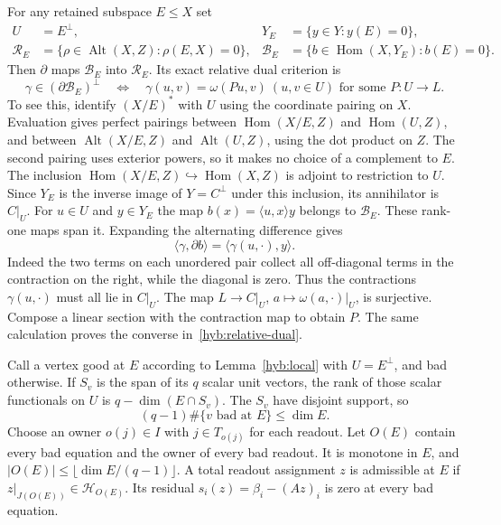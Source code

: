 \documentclass[11pt]{article}
\DeclareMathOperator{\Hom}{Hom}
\DeclareMathOperator{\Alt}{Alt}
\theoremstyle{definition}
\theoremstyle{remark}
\numberwithin{equation}{section}
\begin{document}
For any retained subspace $E\le X$ set
\[
 \begin{aligned}
 U&=E^\perp,& Y_E&=\{y\in Y:y(E)=0\},\\
 \mathcal R_E&=\{\rho\in\Alt(X,Z):\rho(E,X)=0\},&
 \mathcal B_E&=\{b\in\Hom(X,Y_E):b(E)=0\}.
 \end{aligned}
\]
Then $\partial$ maps $\mathcal B_E$ into $\mathcal R_E$.
Its exact relative dual criterion is
\begin{equation}
 \gamma\in(\partial\mathcal B_E)^\perp
 \quad\Longleftrightarrow\quad
 \gamma(u,v)=\omega(Pu,v)\ (u,v\in U)
 \text{ for some }P:U\to L.
 \label{hyb:relative-dual}
\end{equation}
To see this, identify \((X/E)^*\) with \(U\) using the coordinate
pairing on \(X\). Evaluation gives perfect pairings
between \(\Hom(X/E,Z)\) and \(\Hom(U,Z)\), and between
\(\Alt(X/E,Z)\) and \(\Alt(U,Z)\), using the dot product on \(Z\).
The second pairing uses exterior powers, so it makes no choice of a
complement to \(E\). The inclusion
\(\Hom(X/E,Z)\hookrightarrow\Hom(X,Z)\) is adjoint to restriction to
\(U\). Since \(Y_E\) is the inverse image of \(Y=C^\perp\) under this
inclusion, its annihilator is \(C|_U\). For \(u\in U\) and \(y\in Y_E\)
the map \(b(x)=\langle u,x\rangle y\) belongs to \(\mathcal B_E\).
These rank-one maps span it. Expanding the alternating difference gives
\[
 \langle\gamma,\partial b\rangle
   =\langle\gamma(u,\cdot),y\rangle .
\]
Indeed the two terms on each unordered pair collect all off-diagonal
terms in the contraction on the right, while the diagonal is zero.
Thus the contractions \(\gamma(u,\cdot)\) must all lie in \(C|_U\).
The map \(L\to C|_U\), \(a\mapsto\omega(a,\cdot)|_U\), is surjective.
Compose a linear section with the contraction map to obtain \(P\).
The same calculation proves the converse in~\eqref{hyb:relative-dual}.

Call a vertex good at $E$ according to Lemma~\ref{hyb:local} with
$U=E^\perp$, and bad otherwise.  If $S_v$ is the span of its $q$ scalar
unit vectors, the rank of those scalar functionals on $U$ is
$q-\dim(E\cap S_v)$.  The $S_v$ have disjoint support, so
\begin{equation}
 (q-1)\#\{v\text{ bad at }E\}\le\dim E.
 \label{hyb:bad-budget}
\end{equation}
Choose an owner $o(j)\in I$ with $j\in T_{o(j)}$ for each readout.
Let $O(E)$ contain every bad equation and the owner of every bad
readout.  It is monotone in $E$, and $|O(E)|\le\lfloor\dim E/(q-1)\rfloor$.
A total readout assignment $z$ is admissible at $E$ if
$z|_{J(O(E))}\in\mathcal H_{O(E)}$.  Its residual
$s_i(z)=\beta_i-(Az)_i$ is zero at every bad equation.
\end{document}
